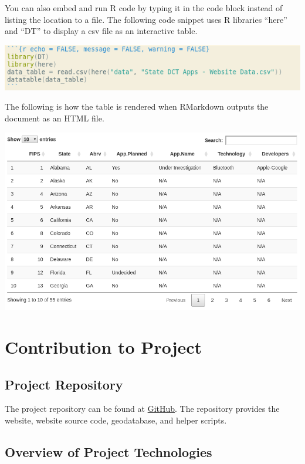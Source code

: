 \documentclass[
]{book}
\begin{document}
You can also embed and run R code by typing it in the code block instead of listing the location to a file. The following code snippet uses R libraries ``here'' and ``DT'' to display a csv file as an interactive table.

\includegraphics{images/03-rmarkdown_4.png}

The following is how the table is rendered when RMarkdown outputs the document as an HTML file.

\includegraphics{images/03-rmarkdown_5.png}

\hypertarget{contribution-to-project}{%
\chapter{Contribution to Project}\label{contribution-to-project}}

\hypertarget{project-repository}{%
\section{Project Repository}\label{project-repository}}

The project repository can be found at \href{https://github.com/Peter-Kedron/COVID-19-Digital-Contact-Tracing-and-Geospatial-Technologies-and-Privacy}{GitHub}. The repository provides the website, website source code, geodatabase, and helper scripts.

\hypertarget{overview-of-project-technologies}{%
\section{Overview of Project Technologies}\label{overview-of-project-technologies}}
\end{document}
